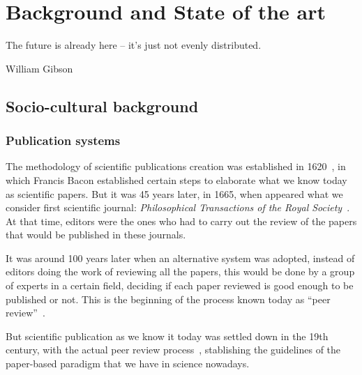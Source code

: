 \chapter{Background and State of the art}

\begin{FraseCelebre}
  \begin{Frase}
    The future is already here – it's just not evenly distributed.
  \end{Frase}
  \begin{Fuente}
    William Gibson
  \end{Fuente}
\end{FraseCelebre}


\section{Socio-cultural background}
\label{scb}
\subsection{Publication systems}
\label{scb:ps}
The methodology of scientific publications creation was established in
1620~\cite{bacon1878novum}, in which Francis Bacon established certain steps to
elaborate what we know today as scientific papers. But it was 45 years later, in
1665, when appeared what we consider first scientific journal:
\emph{Philosophical Transactions of the Royal
  Society}~\cite{kronick1976history}. At that time, editors were the ones who
had to carry out the review of the papers that would be published in these
journals.

It was around 100 years later when an alternative system was adopted, instead of
editors doing the work of reviewing all the papers, this would be done by a
group of experts in a certain field, deciding if each paper reviewed is good
enough to be published or not. This is the beginning of the process known today
as ``peer review''~\cite{spier2002history}.

But scientific publication as we know it today was settled down in the 19th
century, with the actual peer review process~\cite{burnham1990evolution},
stablishing the guidelines of the paper-based paradigm that we have in science
nowadays.


